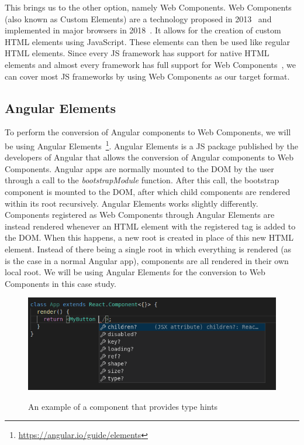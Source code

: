 This brings us to the other option, namely Web Components. Web Components (also known as Custom Elements) are a technology proposed in 2013~ and implemented in major browsers in 2018~. It allows for the creation of custom HTML elements using JavaScript. These elements can then be used like regular HTML elements. Since every JS framework has support for native HTML elements and almost every framework has full support for Web Components~, we can cover most JS frameworks by using Web Components as our target format.

\subsection{Angular Elements}\label{sec:bg:angularelements}
To perform the conversion of Angular components to Web Components, we will be using Angular Elements~\footnote{\url{https://angular.io/guide/elements}}. Angular Elements is a JS package published by the developers of Angular that allows the conversion of Angular components to Web Components. Angular apps are normally mounted to the DOM by the user through a call to the \emph{bootstrapModule} function. After this call, the bootstrap component is mounted to the DOM, after which child components are rendered within its root recursively. Angular Elements works slightly differently. Components registered as Web Components through Angular Elements are instead rendered whenever an HTML element with the registered tag is added to the DOM\@. When this happens, a new root is created in place of this new HTML element. Instead of there being a single root in which everything is rendered (as is the case in a normal Angular app), components are all rendered in their own local root. We will be using Angular Elements for the conversion to Web Components in this case study.

\begin{figure}[h]
	\caption{An example of a component that provides type hints}
	\includegraphics[width=\columnwidth]{figures/background/hinting.png}
	\label{fig:bg:hinting}
	\centering
\end{figure}

